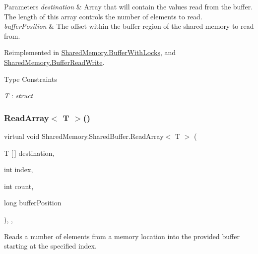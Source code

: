 \begin{DoxyParams}{Parameters}
{\em destination} & Array that will contain the values read from the buffer. The length of this array controls the number of elements to read.\\
\hline
{\em buffer\+Position} & The offset within the buffer region of the shared memory to read from.\\
\hline
\end{DoxyParams}


Reimplemented in \hyperlink{class_shared_memory_1_1_buffer_with_locks_a247e1e8f8f2849b65ee985f3b08cca97}{Shared\+Memory.\+Buffer\+With\+Locks}, and \hyperlink{class_shared_memory_1_1_buffer_read_write_a3c49b75b3b06a22c73bfd26c90d220d6}{Shared\+Memory.\+Buffer\+Read\+Write}.

\begin{Desc}
\item[Type Constraints]\begin{description}
\item[{\em T} : {\em struct}]\end{description}
\end{Desc}
\mbox{\label{class_shared_memory_1_1_shared_buffer_aca716450a74551277e53000d61a59fcd}} 
\subsubsection{\texorpdfstring{Read\+Array$<$ T $>$()}{ReadArray< T >()}}
{\footnotesize\ttfamily virtual void Shared\+Memory.\+Shared\+Buffer.\+Read\+Array$<$ T $>$ (\begin{DoxyParamCaption}\item[{T \mbox{[}$\,$\mbox{]}}]{destination,  }\item[{int}]{index,  }\item[{int}]{count,  }\item[{long}]{buffer\+Position }\end{DoxyParamCaption})\hspace{0.3cm}{\ttfamily [inline]}, {\ttfamily [protected]}, {\ttfamily [virtual]}}



Reads a number of elements from a memory location into the provided buffer starting at the specified index. 


